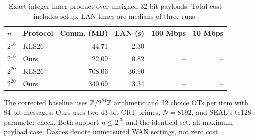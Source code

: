\begin{table}[t]
\centering
\caption{Exact integer inner product over unsigned 32-bit payloads. Total cost includes setup. LAN times are medians of three runs.}
\label{tab:integer-corrected}
\begin{tabular}{llrrrr}
\toprule
$n$ & Protocol & Comm. (MB) & LAN (s) & 100 Mbps & 10 Mbps \\
\midrule
$2^{16}$ & KLS26 & 44.71 & 2.30 & -- & -- \\
$2^{16}$ & Ours & 22.09 & 0.82 & -- & -- \\
$2^{20}$ & KLS26 & 708.06 & 36.90 & -- & -- \\
$2^{20}$ & Ours & 340.69 & 13.34 & -- & -- \\
\bottomrule
\end{tabular}
\par\smallskip\footnotesize
The corrected baseline uses $\mathbb{Z}/2^{84}\mathbb{Z}$ arithmetic and 32 choice OTs per item with 84-bit messages.
Ours uses two 43-bit CRT primes, $N=8192$, and SEAL's tc128 parameter check.
Both support $n\le 2^{20}$ and the identical-set, all-maximum-payload case.
Dashes denote unmeasured WAN settings, not zero cost.
\end{table}
